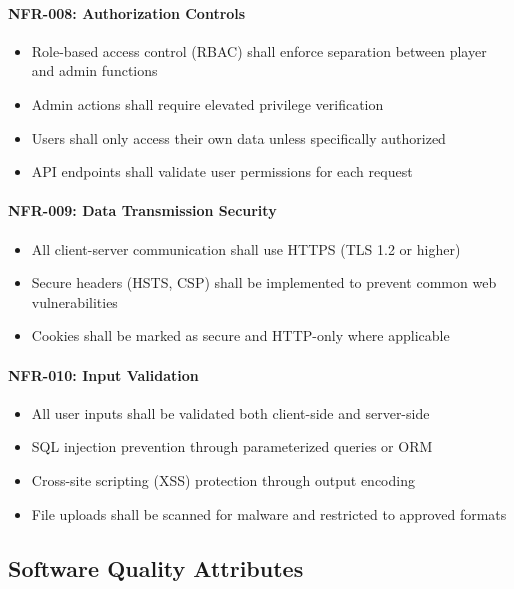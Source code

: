 \documentclass[12pt,a4paper]{article}
\begin{document}
\begin{enumerate}
\paragraph{NFR-008: Authorization Controls}
\begin{itemize}
    \item Role-based access control (RBAC) shall enforce separation between player and admin functions
    \item Admin actions shall require elevated privilege verification
    \item Users shall only access their own data unless specifically authorized
    \item API endpoints shall validate user permissions for each request
\end{itemize}

\paragraph{NFR-009: Data Transmission Security}
\begin{itemize}
    \item All client-server communication shall use HTTPS (TLS 1.2 or higher)
    \item Secure headers (HSTS, CSP) shall be implemented to prevent common web vulnerabilities
    \item Cookies shall be marked as secure and HTTP-only where applicable
\end{itemize}

\paragraph{NFR-010: Input Validation}
\begin{itemize}
    \item All user inputs shall be validated both client-side and server-side
    \item SQL injection prevention through parameterized queries or ORM
    \item Cross-site scripting (XSS) protection through output encoding
    \item File uploads shall be scanned for malware and restricted to approved formats
\end{itemize}

\subsection{Software Quality Attributes}


\end{enumerate}
\end{document}
